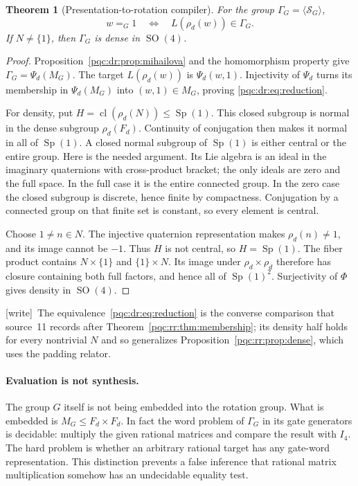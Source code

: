 \documentclass[11pt,letterpaper]{article}
\numberwithin{equation}{section}
\newtheorem{theorem}{Theorem}[section]
\theoremstyle{definition}
\theoremstyle{remark}
\newcommand{\wtag}{\textup{[write]}}
\newcommand{\SO}{\operatorname{SO}}
\newcommand{\Sp}{\operatorname{Sp}}
\newcommand{\cl}{\operatorname{cl}}
\begin{document}
\begin{theorem}[Presentation-to-rotation compiler]
\label{pqc:dr:thm:compiler}
For the group $\Gamma_G=\langle\mathcal S_G\rangle$,
\begin{equation}
 w=_G1\quad\Longleftrightarrow\quad
 L(\rho_d(w))\in\Gamma_G.
 \label{pqc:dr:eq:reduction}
\end{equation}
If $N\ne\{1\}$, then $\Gamma_G$ is dense in $\SO(4)$.
\end{theorem}
\begin{proof}
Proposition~\ref{pqc:dr:prop:mihailova} and the homomorphism property give
$\Gamma_G=\Psi_d(M_G)$. The target $L(\rho_d(w))$ is
$\Psi_d(w,1)$. Injectivity of $\Psi_d$ turns its membership in
$\Psi_d(M_G)$ into $(w,1)\in M_G$, proving \eqref{pqc:dr:eq:reduction}.

For density, put $H=\cl(\rho_d(N))\leq\Sp(1)$. This closed subgroup
is normal in the dense subgroup $\rho_d(F_d)$. Continuity of conjugation
then makes it normal in all of $\Sp(1)$. A closed normal subgroup of
$\Sp(1)$ is either central or the entire group. Here is the needed
argument. Its Lie algebra is an ideal in the imaginary quaternions
with cross-product bracket; the only ideals are zero and the full
space. In the full case it is the entire connected group. In the zero
case the closed subgroup is discrete, hence finite by compactness.
Conjugation by a connected group on that finite set is constant, so
every element is central.

Choose $1\ne n\in N$. The injective quaternion representation makes
$\rho_d(n)\ne1$, and its image cannot be $-1$. Thus $H$ is not
central, so $H=\Sp(1)$. The fiber product contains $N\times\{1\}$
and $\{1\}\times N$. Its image under $\rho_d\times\rho_d$ therefore
has closure containing both full factors, and hence all of
$\Sp(1)^2$. Surjectivity of $\Phi$ gives density in $\SO(4)$.
\end{proof}
\wtag\ The equivalence~\eqref{pqc:dr:eq:reduction} is the converse comparison
that source~11 records after Theorem~\ref{pqc:rr:thm:membership}; its density
half holds for every nontrivial $N$ and so generalizes
Proposition~\ref{pqc:rr:prop:dense}, which uses the padding relator.

\paragraph{Evaluation is not synthesis.}
The group $G$ itself is not being embedded into the rotation group.
What is embedded is $M_G\leq F_d\times F_d$. In fact the word problem
of $\Gamma_G$ in its gate generators is decidable: multiply the given
rational matrices and compare the result with $I_4$. The hard problem is
whether an arbitrary rational target has any gate-word representation.
This distinction prevents a false inference that rational matrix
multiplication somehow has an undecidable equality test.
\end{document}
